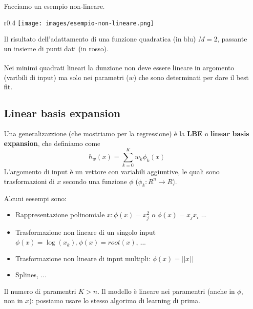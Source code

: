 \begin{example}
    Facciamo un esempio non-lineare.
\end{example}
\begin{wrapfigure}[10]{r}{0.4\textwidth}
    \vspace{-25pt}
    \centering
    \texttt{[image: images/esempio-non-lineare.png]}
\end{wrapfigure}
Il risultato dell'adattamento di una funzione quadratica (in blu) $M=2$, passante un insieme di punti dati (in rosso). \\\\
Nei minimi quadrati lineari la dunzione non deve essere lineare in argomento (varibili di input) ma solo nei parametri ($w$) che sono
determinati per dare il best fit.

\subsection{Linear basis expansion}
Una generalizazzione (che mostriamo per la regressione) è la \textbf{LBE} o \textbf{linear basis expansion}, che definiamo come
$$h_w(x) = \sum_{k=0}^{K}w_k\phi_k(x)$$
L'argomento di input è un vettore con variabili aggiuntive, le quali sono trasformazioni di $x$ secondo una funzione $\phi$ ($\phi_k: R^n \to R$).
\begin{example}
    Alcuni eesempi sono:
    \begin{itemize}
        \item Rappresentazione polinomiale $x: \phi(x) = x_j^2$ o $\phi(x) = x_jx_i$ ...
        \item Trasformazione non lineare di un singolo input $\phi(x) = \log(x_k), \phi(x) = root(x)$, ...
        \item Trasformazione non lineare di input multipli: $\phi(x) = ||x||$
        \item Splines, ...
    \end{itemize}
\end{example}
\hspace{-15pt}Il numero di paramentri $K>n$. Il modello è lineare nei paramentri (anche in $\phi$, non in $x$): possiamo usare lo stesso
algorimo di learning di prima.

